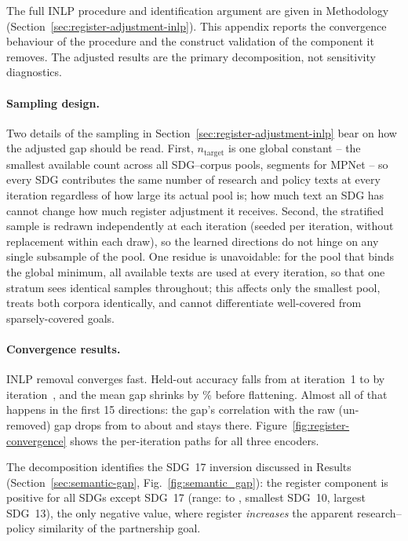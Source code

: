 \documentclass[12pt,a4paper]{article}
\begin{document}
The full INLP procedure and identification argument are given in Methodology (Section~\ref{sec:register-adjustment-inlp}). This appendix reports the convergence behaviour of the procedure and the construct validation of the component it removes. The adjusted results are the primary decomposition, not sensitivity diagnostics.

\paragraph{Sampling design.}
Two details of the sampling in Section~\ref{sec:register-adjustment-inlp} bear on how the adjusted gap should be read. First, $n_{\text{target}}$ is one global constant -- the smallest available count across all SDG--corpus pools, \RegisterIterNPerSdg{} segments for MPNet -- so every SDG contributes the same number of research and policy texts at every iteration regardless of how large its actual pool is; how much text an SDG has cannot change how much register adjustment it receives. Second, the stratified sample is redrawn independently at each iteration (seeded per iteration, without replacement within each draw), so the learned directions do not hinge on any single subsample of the pool. One residue is unavoidable: for the pool that binds the global minimum, all available texts are used at every iteration, so that one stratum sees identical samples throughout; this affects only the smallest pool, treats both corpora identically, and cannot differentiate well-covered from sparsely-covered goals.

\paragraph{Convergence results.}\label{app:register-inlp}
INLP removal converges fast. Held-out accuracy falls from \RegisterFirstAcc{} at iteration~1 to \RegisterFinalAcc{} by iteration~\RegisterIterFinalK{}, and the mean gap shrinks by \RegisterIterReductionPct{}\% before flattening. Almost all of that happens in the first 15 directions: the gap's correlation with the raw (un-removed) gap drops from \RegisterIterRhoAtOne{} to about \RegisterIterPlateauRho{} and stays there. Figure~\ref{fig:register-convergence} shows the per-iteration paths for all three encoders.

The decomposition identifies the SDG~17 inversion discussed in Results (Section~\ref{sec:semantic-gap}, Fig.~\ref{fig:semantic_gap}): the register component is positive for all SDGs except SDG~17 (range: \RegCompSdgTen{} to \RegCompSdgThirteen{}, smallest SDG~10, largest SDG~13), the only negative value, where register \emph{increases} the apparent research--policy similarity of the partnership goal.
\end{document}
